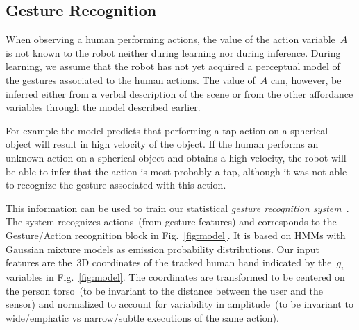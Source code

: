 \newcommand{\modeltwo}{
  \begin{tikzpicture}[scale=\myscalefactor, every node/.style={scale=\myscalefactor}]
  \matrix (M) [matrix of nodes, ampersand replacement=\&] {%
    grasp gesture HMM \& \standardhmm{1} \\
    tap gesture HMM \& \standardhmm{2} \\
    touch gesture HMM \& \standardhmm{3} \\
  };
  \end{tikzpicture}
}


\subsection{Gesture Recognition}
\label{sec:gesture_recognition}
When observing a human performing actions, the value of the action variable~$A$ is not known to the robot neither during learning nor during inference.
During learning, we assume that the robot has not yet acquired a perceptual model of the gestures associated to the human actions.
The value of~$A$ can, however, be inferred either from a verbal description of the scene or from the other affordance variables through the \AffWords{} model described earlier.

For example the \AffWords{} model predicts that performing a tap action on a spherical object will result in high velocity of the object.
If the human performs an unknown action on a spherical object and obtains a high velocity, the robot will be able to infer that the action is most probably a tap, although it was not able to recognize the gesture associated with this action.

This information can be used to train our statistical \emph{gesture recognition system}~\cite{saponaro:2013:crhri}.
The system recognizes actions~(from gesture features) and corresponds to the Gesture/Action recognition block in Fig.~\ref{fig:model}.
It is based on \acp{HMM} with Gaussian mixture models as emission probability distributions.
Our input features are the~3D coordinates of the tracked human hand indicated by the~$g_i$ variables in Fig.~\ref{fig:model}.
The coordinates are transformed to be centered on the person torso~(to be invariant to the distance between the user and the sensor) and normalized to account for variability in amplitude~(to be invariant to wide/emphatic vs narrow/subtle executions of the same action).


